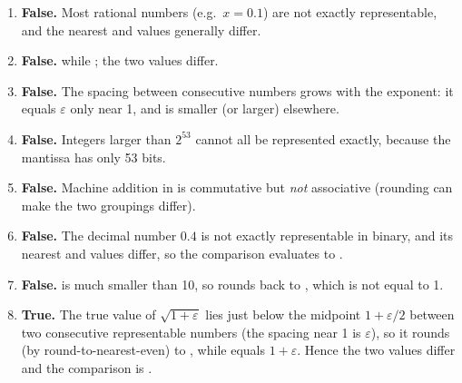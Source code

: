 \documentclass[a4paper]{article}
\begin{document}
\begin{enumerate}[itemsep=8pt]
    \item \textbf{False.}
        Most rational numbers (e.g.\ $x = 0.1$) are not exactly
        representable, and the nearest  and 
        values generally differ.

    \item \textbf{False.}
         while
        ; the two values differ.

    \item \textbf{False.}
        The spacing between consecutive numbers grows with the exponent:
        it equals $\varepsilon$ only near 1, and is smaller (or larger)
        elsewhere.

    \item \textbf{False.}
        Integers larger than $2^{53}$ cannot all be represented exactly,
        because the  mantissa has only 53 bits.

    \item \textbf{False.}
        Machine addition in  is commutative but \emph{not}
        associative (rounding can make the two groupings differ).

    \item \textbf{False.}
        The decimal number $0.4$ is not exactly representable in binary,
        and its nearest  and  values differ,
        so the comparison evaluates to .

    \item \textbf{False.}
         is much smaller than 10, so 
        rounds back to , which is not equal to 1.

    \item \textbf{True.}
        The true value of $\sqrt{1 + \varepsilon}$ lies just below the
        midpoint $1 + \varepsilon/2$ between two consecutive representable
        numbers (the spacing near 1 is $\varepsilon$), so it rounds
        (by round-to-nearest-even) to ,
        while  equals $1 + \varepsilon$.
        Hence the two values differ and the comparison is .
\end{enumerate}
\fi
\end{document}
